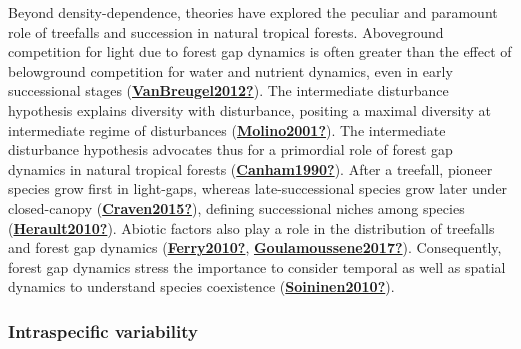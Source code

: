\documentclass[12pt,twoside,a4paper, a]{article}
\begin{document}
Beyond density-dependence, theories have explored the peculiar and paramount role of treefalls and succession in natural tropical forests.
Aboveground competition for light due to forest gap dynamics is often greater than the effect of belowground competition for water and nutrient dynamics, even in early successional stages (\protect\hyperlink{ref-VanBreugel2012}{\textbf{VanBreugel2012?}}).
The intermediate disturbance hypothesis explains diversity with disturbance,
positing a maximal diversity at intermediate regime of disturbances (\protect\hyperlink{ref-Molino2001}{\textbf{Molino2001?}}).
The intermediate disturbance hypothesis advocates thus for a primordial role of forest gap dynamics in natural tropical forests (\protect\hyperlink{ref-Canham1990}{\textbf{Canham1990?}}).
After a treefall, pioneer species grow first in light-gaps, whereas late-successional species grow later under closed-canopy (\protect\hyperlink{ref-Craven2015}{\textbf{Craven2015?}}), defining successional niches among species (\protect\hyperlink{ref-Herault2010}{\textbf{Herault2010?}}).
Abiotic factors also play a role in the distribution of treefalls and forest gap dynamics (\protect\hyperlink{ref-Ferry2010}{\textbf{Ferry2010?}}, \protect\hyperlink{ref-Goulamoussene2017}{\textbf{Goulamoussene2017?}}).
Consequently, forest gap dynamics stress the importance to consider temporal as well as spatial dynamics to understand species coexistence (\protect\hyperlink{ref-Soininen2010}{\textbf{Soininen2010?}}).

\hypertarget{intraspecific-variability}{%
\subsubsection{Intraspecific variability}\label{intraspecific-variability}}
\end{document}
